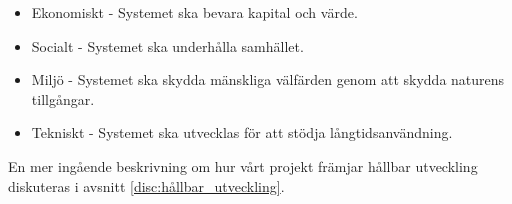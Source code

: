 \begin{itemize}
	\item Ekonomiskt -  Systemet ska bevara kapital och värde.
	\item Socialt - Systemet ska underhålla samhället.
	\item Miljö - Systemet ska skydda mänskliga välfärden genom att skydda naturens tillgångar.
	\item Tekniskt - Systemet ska utvecklas för att stödja långtidsanvändning.
\end{itemize}
En mer ingående beskrivning om hur vårt projekt främjar hållbar utveckling diskuteras i avsnitt \ref{disc:hållbar_utveckling}.


